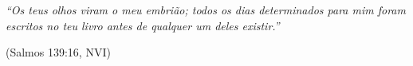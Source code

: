\begin{epigrafe}
    \vspace*{\fill}
    \begin{flushright}
        \textit{``Os teus olhos viram o meu embrião; todos os dias determinados para mim foram escritos no teu livro antes de qualquer um deles existir.''}
        
        (Salmos 139:16, NVI)
    \end{flushright}
    \vspace*{3cm}
\end{epigrafe}
